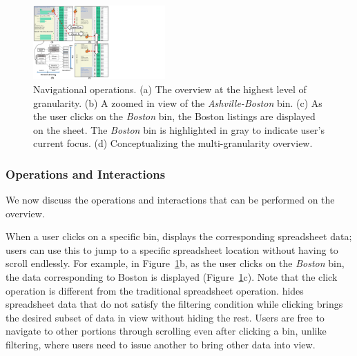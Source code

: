 \begin{figure}[t]
        \centering
        \includegraphics[width=0.45\textwidth,trim={0 0 400 0},clip]{images/navigationOp.pdf}
\vspace{-10pt}
   \caption{Navigational operations. (a) The overview at the highest level of granularity. (b) A zoomed in view of the \emph{Ashville-Boston} bin. (c) As the user clicks on the \emph{Boston} bin, the Boston listings are displayed on the sheet. The \emph{Boston} bin is highlighted in gray to indicate user’s current focus. (d) Conceptualizing the multi-granularity overview. }
\vspace{-18pt}
   \label{fig:concept}
 \end{figure}

\subsubsection{Operations and Interactions}
\label{sec:overview_operations}
We now discuss the operations and interactions that can be performed on the overview.

When a user clicks on a specific bin,
\noah displays the corresponding spreadsheet data;
users can use this to jump to a specific spreadsheet location
without having to scroll endlessly.
For example, in Figure~\ref{fig:concept}b,
as the user clicks on the \emph{Boston} bin,
the data corresponding to Boston is displayed
(Figure~\ref{fig:concept}c).
Note that the click operation is different from the traditional
spreadsheet  operation.
 hides spreadsheet data
that do not satisfy the filtering condition while
clicking brings the desired subset of data
in view without hiding the rest.
Users are free to navigate to other portions
through scrolling
even after clicking a bin, unlike filtering,
where users need to issue another 
to bring other data into view.


